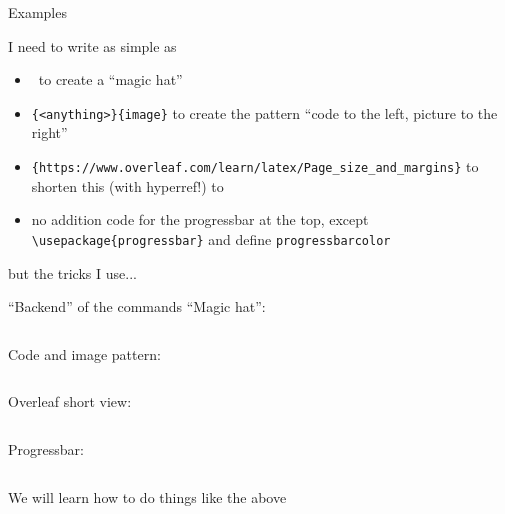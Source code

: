 {
\supressprogressbarfalse

\begin{frame}[fragile]{Examples\preMagicPage}\relax

I need to write as simple as
\begin{itemize}
    \item \ccol\magicPage\ to create a ``magic hat''
    \item \ccol\twocolImg\verb|{<anything>}{image}| to create the pattern ``code to the left, picture to the right''
    \item \ccol\overC\verb|{https://www.overleaf.com/learn/latex/Page_size_and_margins}| to shorten this (with hyperref!) to 
    \item no addition code for the progressbar at the top, except \verb|\usepackage{progressbar}| and define \texttt{progressbarcolor}
     
\end{itemize}
\inpause but the tricks I use... 
     
\end{frame}

\begin{frame}{``Backend'' of the commands\magicPage}\relax
    ``Magic hat'':
    \inputminted[firstline=194, lastline=200, fontsize=\tiny]{latex}{sec0/code/latexLectures.sty}
    
    Code and image pattern:
    \inputminted[firstline=55, lastline=70, fontsize=\tiny]{latex}{sec0/code/latexLectures.sty}
    
    Overleaf short view:
    \inputminted[firstline=311, lastline=313, fontsize=\tiny]{latex}{sec0/code/latexLectures.sty}
    
    Progressbar:
    \inputminted[fontsize=\tiny]{latex}{sec0/code/progressbar.sty}
\end{frame}

}

\begin{frame}\relax

\centering\large We will learn how to do things like the above 
     
\end{frame}

